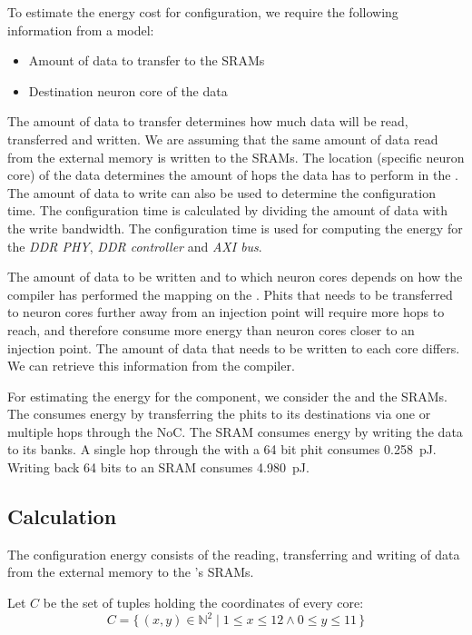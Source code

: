 To estimate the energy cost for configuration, we require the following information from a model:
\begin{itemize}
    \item Amount of data to transfer to the SRAMs
    \item Destination neuron core of the data
\end{itemize}

The amount of data to transfer determines how much data will be read, transferred and written.
We are assuming that the same amount of data read from the external memory is written to the SRAMs.
The location (specific neuron core) of the data determines the amount of hops the data has to perform in the \confignoc{}.
The amount of data to write can also be used to determine the configuration time.
The configuration time is calculated by dividing the amount of data with the write bandwidth.
The configuration time is used for computing the energy for the \textit{DDR PHY}, \textit{DDR controller} and \textit{AXI bus}.

The amount of data to be written and to which neuron cores depends on how the compiler has performed the mapping on the \graicore{}. %
Phits that needs to be transferred to neuron cores further away from an injection point will require more hops to reach, and therefore consume more energy than neuron cores closer to an injection point.
The amount of data that needs to be written to each core differs.
We can retrieve this information from the compiler.

For estimating the energy for the \graicore{} component, we consider the \confignoc{} and the SRAMs.
The \confignoc{} consumes energy by transferring the phits to its destinations via one or multiple hops through the NoC.
The SRAM consumes energy by writing the data to its banks.
A single hop through the \confignoc{} with a 64 bit phit consumes \SI{0.258}{pJ}.
Writing back 64 bits to an SRAM consumes \SI{4.980}{pJ}.

\subsection{Calculation}
The configuration energy consists of the reading, transferring and writing of data from the external memory to the \graicore{}'s SRAMs. 

Let $C$ be the set of tuples holding the coordinates of every core:
\begin{equation*}
    C = \{\,\left(x,y\right) \in \mathbb{N}^2 \mid 1 \leq x \leq 12 \wedge 0 \leq y \leq 11 \,\} 
\end{equation*}

